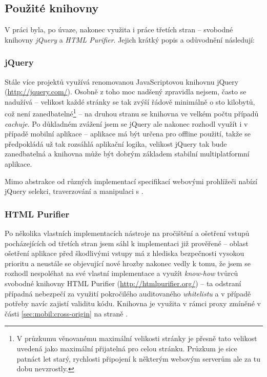 \subsection{Použité knihovny}
V práci byla, po úvaze, nakonec využita i práce třetích stran -- svobodné knihovny \emph{jQuery} a \emph{HTML Purifier}. Jejich krátký popis a odůvodnění následují:

\subsubsection{jQuery}
Stále více projektů využívá renomovanou JavaScriptovou knihovnu jQuery (\url{http://jquery.com/}). Osobně z toho moc nadšený zpravidla nejsem, často se nadužívá -- velikost každé stránky se tak zvýší řádově minimálně o sto kilobytů, což není zanedbatelné\footnote{V průzkumu \cite{PagesizeUseit} věnovanému maximální velikosti stránky je přesně tato velikost uvedená jako maximální přijatelná pro celou stránku. Průzkum je sice patnáct let starý, rychlosti připojení k některým webovým serverům ale za tu dobu nevzrostly.} -- na druhou stranu se knihovna ve velkém počtu případů \textit{cachuje}. Po důkladném zvážení jsem se jQuery ale nakonec rozhodl využít i v případě mobilní aplikace -- aplikace má být určena pro offline použití, takže se předpokládá už tak rozsáhlá aplikační logika, velikost jQuery tak bude zanedbatelná a knihovna může být dobrým základem stabilní multiplatformní aplikace.

Mimo abstrakce od různých implementací specifikací webovými prohlížeči nabízí jQuery selekci, traverzování a manipulaci s .

\subsubsection{HTML Purifier}
Po několika vlastních implementacích nástroje na pročištění a ošetření  vstupů pocházejících od třetích stran jsem sáhl k implementaci již prověřené -- oblast ošetření aplikace před škodlivými vstupy má z hlediska bezpečnosti vysokou prioritu a neustále se objevující nové hrozby nakonec vedly k tomu, že jsem se rozhodl nespoléhat na své vlastní implementace a využít \textit{know-how} tvůrců svobodné  knihovny HTML Purifier (\url{http://htmlpurifier.org/}) -- ta odstraní případná nebezpečí za využití pokročilého auditovaného \textit{whitelistu} a v případě potřeby navíc zajistí validitu kódu. Knihovna je využita v rámci proxy zmíněné v části \ref{sec:mobil:cross-origin} na straně \pageref{sec:mobil:cross-origin}.


